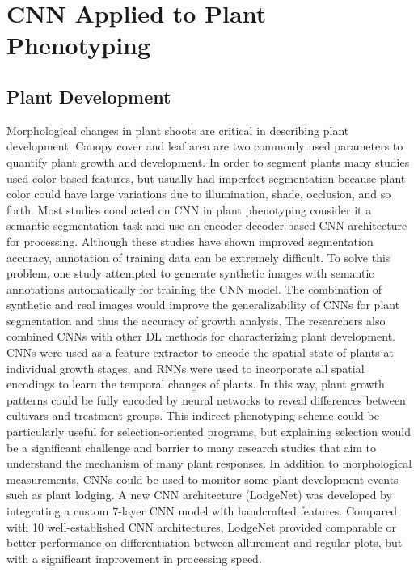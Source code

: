 \section{CNN Applied to Plant Phenotyping}
\subsection{Plant Development}
Morphological changes in plant shoots are critical in describing plant development. Canopy cover and leaf area are two commonly used parameters to quantify plant
growth and development. In order to segment plants many studies used color-based features, but usually had imperfect segmentation because plant color could have large
variations due to illumination, shade, occlusion, and so forth. Most studies conducted on CNN in plant phenotyping consider it a semantic segmentation task and use
an encoder-decoder-based CNN architecture for processing. Although these studies have shown improved segmentation accuracy, annotation of training data can be
extremely difficult. To solve this problem, one study attempted to generate synthetic images with semantic annotations automatically for training the CNN model.
The combination of synthetic and real images would improve the generalizability of CNNs for plant segmentation and thus the accuracy of growth analysis.
The researchers also combined CNNs with other DL methods for characterizing plant development. CNNs were used as a feature extractor to encode the spatial
state of plants at individual growth stages, and RNNs were used to incorporate all spatial encodings to learn the temporal changes of plants. In this way,
plant growth patterns could be fully encoded by neural networks to reveal differences between cultivars and treatment groups. This indirect phenotyping scheme
could be particularly useful for selection-oriented programs, but explaining selection would be a significant challenge and barrier to many research studies that
aim to understand the mechanism of many plant responses. In addition to morphological measurements, CNNs could be used to monitor some plant development events
such as plant lodging. A new CNN architecture (LodgeNet) was developed by integrating a custom 7-layer CNN model with handcrafted features. Compared with
10 well-established CNN architectures, LodgeNet provided comparable or better performance on differentiation between allurement and regular plots, but with a
significant improvement in processing speed.


